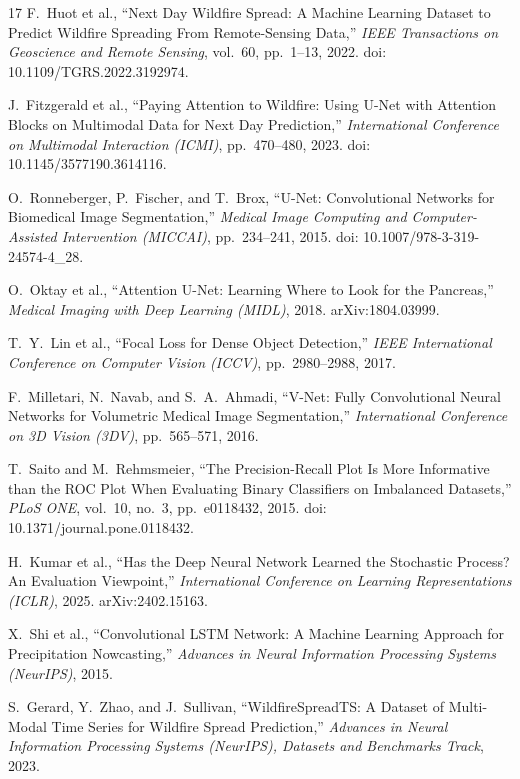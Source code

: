 \documentclass[10pt,letterpaper,twocolumn]{article}
\begin{document}
\begin{thebibliography}{17}
\small
{} F.~Huot et al., ``Next Day Wildfire Spread: A Machine Learning
Dataset to Predict Wildfire Spreading From Remote-Sensing Data,'' \textit{IEEE
Transactions on Geoscience and Remote Sensing}, vol.~60, pp.~1--13, 2022. doi:
10.1109/TGRS.2022.3192974.

 J.~Fitzgerald et al., ``Paying Attention to Wildfire:
Using U-Net with Attention Blocks on Multimodal Data for Next Day Prediction,''
\textit{International Conference on Multimodal Interaction (ICMI)}, pp.~470--480,
2023. doi: 10.1145/3577190.3614116.

 O.~Ronneberger, P.~Fischer, and T.~Brox, ``U-Net:
Convolutional Networks for Biomedical Image Segmentation,'' \textit{Medical Image
Computing and Computer-Assisted Intervention (MICCAI)}, pp.~234--241, 2015. doi:
10.1007/978-3-319-24574-4\_28.

 O.~Oktay et al., ``Attention U-Net: Learning Where to Look for
the Pancreas,'' \textit{Medical Imaging with Deep Learning (MIDL)}, 2018.
arXiv:1804.03999.

 T.~Y.~Lin et al., ``Focal Loss for Dense Object Detection,''
\textit{IEEE International Conference on Computer Vision (ICCV)}, pp.~2980--2988,
2017.

 F.~Milletari, N.~Navab, and S.~A.~Ahmadi, ``V-Net: Fully
Convolutional Neural Networks for Volumetric Medical Image Segmentation,''
\textit{International Conference on 3D Vision (3DV)}, pp.~565--571, 2016.

 T.~Saito and M.~Rehmsmeier, ``The Precision-Recall Plot Is More
Informative than the ROC Plot When Evaluating Binary Classifiers on Imbalanced
Datasets,'' \textit{PLoS ONE}, vol.~10, no.~3, pp.~e0118432, 2015. doi:
10.1371/journal.pone.0118432.

 H.~Kumar et al., ``Has the Deep Neural Network Learned the
Stochastic Process? An Evaluation Viewpoint,'' \textit{International Conference on
Learning Representations (ICLR)}, 2025. arXiv:2402.15163.

 X.~Shi et al., ``Convolutional LSTM Network: A Machine Learning
Approach for Precipitation Nowcasting,'' \textit{Advances in Neural Information
Processing Systems (NeurIPS)}, 2015.

 S.~Gerard, Y.~Zhao, and J.~Sullivan, ``WildfireSpreadTS: A
Dataset of Multi-Modal Time Series for Wildfire Spread Prediction,'' \textit{Advances
in Neural Information Processing Systems (NeurIPS), Datasets and Benchmarks Track},
2023.


\end{thebibliography}
\end{document}
